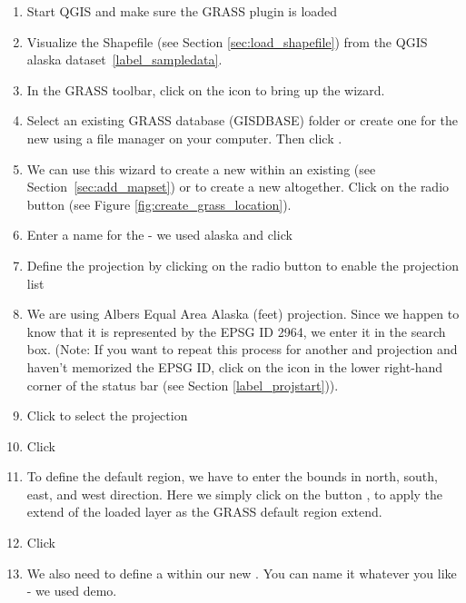 \begin{enumerate}
  \item Start QGIS and make sure the GRASS plugin is loaded
  \item Visualize the  Shapefile (see Section
  \ref{sec:load_shapefile}) from the QGIS alaska dataset~\ref{label_sampledata}.
  \item In the GRASS toolbar, click on the  icon to bring up the  wizard.
  \item Select an existing GRASS database (GISDBASE) folder 
   or create one for the new  using a 
  file manager on your computer. Then click . 
  \item We can use this wizard to create a new  within an 
  existing  (see Section~\ref{sec:add_mapset}) or to create 
  a new  altogether. Click on the radio button
   (see Figure \ref{fig:create_grass_location}).
  \item Enter a name for the  - we used alaska and click 
  \item Define the projection by clicking on the radio button
   to enable the projection list 
  \item We are using Albers Equal Area Alaska (feet) projection. Since we
  happen to know that it is represented by the EPSG ID 2964, we enter it in
  the search box. (Note: If you want to repeat this process for another 
   and projection and haven't memorized the EPSG ID, 
  click on the
   icon in the lower right-hand
  corner of the status bar (see Section \ref{label_projstart})).
  \item Click  to select the projection
  \item Click  
  \item To define the default region, we have to enter the  
  bounds in north, south, east, and west direction. Here we simply click on 
  the button , to apply the extend of the 
  loaded layer  as the GRASS default region extend.
  \item Click  
  \item We also need to define a  within our new 
  . You can name it whatever you like - we used demo.

\end{enumerate}

